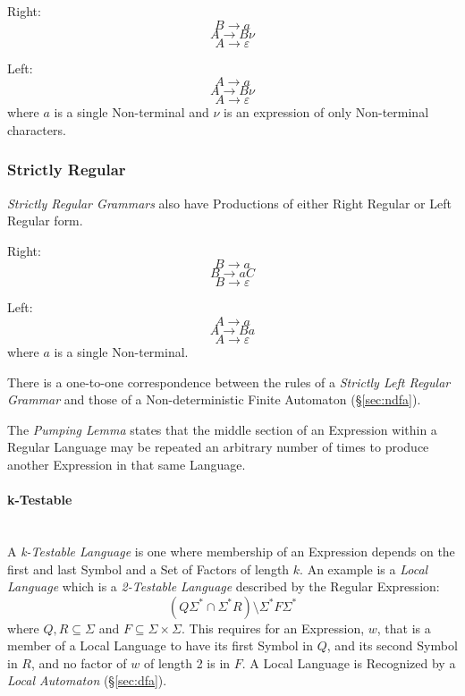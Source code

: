 Right:
\[
  B \rightarrow a
\]\[
  A \rightarrow B \nu
\]\[
  A \rightarrow \varepsilon
\]

Left:
\[
  A \rightarrow a
\]\[
  A \rightarrow B \nu
\]\[
  A \rightarrow \varepsilon
\]
where $a$ is a single Non-terminal and $\nu$ is an expression of only
Non-terminal characters.



\subsubsection{Strictly Regular}\label{sec:strictly_regular}

\emph{Strictly Regular Grammars} also have Productions of either Right
Regular or Left Regular form.

Right:
\[
  B \rightarrow a
\]\[
  B \rightarrow aC
\]\[
  B \rightarrow \varepsilon
\]

Left:
\[
  A \rightarrow a
\]\[
  A \rightarrow Ba
\]\[
  A \rightarrow \varepsilon
\]
where $a$ is a single Non-terminal.

There is a one-to-one correspondence between the rules of a
\emph{Strictly Left Regular Grammar} and those of a Non-deterministic
Finite Automaton (\S\ref{sec:ndfa}).

The \emph{Pumping Lemma} states that the middle section of an
Expression within a Regular Language may be repeated an arbitrary
number of times to produce another Expression in that same Language.



\paragraph{k-Testable}\label{sec:k_testable} \hfill \\

A \emph{k-Testable Language} is one where membership of an Expression
depends on the first and last Symbol and a Set of Factors of length
$k$. An example is a \emph{Local Language} which is a \emph{2-Testable
  Language} described by the Regular Expression:
\[
  (Q\Sigma^* \cap \Sigma^*R)\setminus\Sigma^*F\Sigma^*
\]
where $Q,R \subseteq \Sigma$ and $F \subseteq \Sigma \times \Sigma$.
This requires for an Expression, $w$, that is a member of a Local
Language to have its first Symbol in $Q$, and its second Symbol in
$R$, and no factor of $w$ of length 2 is in $F$. A Local Language is
Recognized by a \emph{Local Automaton} (\S\ref{sec:dfa}).



